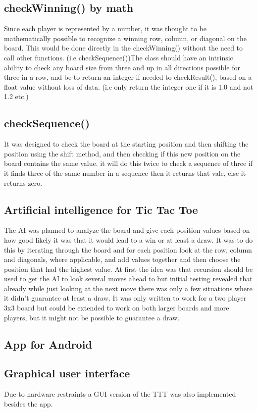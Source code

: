 \documentclass[a4paper,10pt]{article}
\begin{document}
		\subsection{checkWinning() by math}
		Since each player is represented by a number, it was thought to be mathematically possible to recognize a winning row, column, or diagonal on the board.  This would be done directly in the checkWinning() without the need to call other functions. (i.e checkSequence())The class should have an intrinsic ability to check any board size from three and up in all directions possible for three in a row, and be to return an integer if needed to checkResult(), based on a float value without loss of data.  (i.e only return the integer one if it is 1.0 and not 1.2 etc.)
		
		\subsection{checkSequence()}
		It was designed to check the board at the starting position and then shifting the position using the shift method, and then checking if this new position on the board contains the same value. it will do this twice to check a sequence of three if it finds three of the same number in a sequence then it returns that vale, else it returns zero.
		\subsection{Artificial intelligence for Tic Tac Toe}
		The AI was planned to analyze the board and give each position values based on how good likely it was that it would lead to a win or at least a draw. It was to do this by iterating through the board and for each position look at the row, column and diagonals, where applicable, and add values together and then choose the position that had the highest value. At first the idea was  that recursion should be used to get the AI to look several moves ahead to but initial testing revealed that already while just looking at the next move there was only a few situations where it didn’t guarantee at least a draw.
		It was only written to work for a two player 3x3 board but could be extended to work on both larger boards and more players, but it might not be possible to guarantee a draw.
		
		\subsection{App for Android}
		\subsection{Graphical user interface}
		Due to hardware restraints a GUI version of the TTT was also implemented besides the app. 
		 
\end{document}
